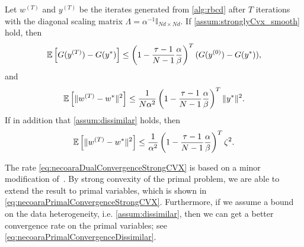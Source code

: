 \begin{theorem} \label{thm:necoaraConvergenceRate}
    Let $w^{(T)}$ and $y^{(T)}$ be the iterates generated from \autoref{alg:rbcd} after $T$ iterations with the diagonal scaling matrix $\Lambda = \alpha^{-1} \mathbb{I}_{Nd \times Nd}$. If \autoref{assum:stronglyCvx_smooth} hold, then
    \begin{equation}
        \mathbb{E} \left[ G( y^{(T)} ) - G( y^* ) \right] \leq \left( 1 - \frac{\tau - 1}{N-1} \frac{\alpha}{\beta} \right)^{T} ( G(y^{(0)}) - G(y^*) ), \label{eq:necoaraDualConvergenceStrongCVX}
    \end{equation}
    and
    \begin{equation}
        \mathbb{E} \left[ \| w^{(T)} - w^* \|^2 \right] 
        \leq \frac{1}{N \alpha^2} \left( 1 - \frac{\tau - 1}{N-1} \frac{\alpha}{\beta} \right)^{T} \|y^*\|^2  \label{eq:necoaraPrimalConvergenceStrongCVX}.
    \end{equation}
    If in addition that \autoref{assum:dissimilar} holds, then
    \begin{equation}
        \mathbb{E} \left[ \| w^{(T)} - w^* \|^2 \right] 
        \leq \frac{1}{\alpha^2} \left( 1 - \frac{\tau - 1}{N-1} \frac{\alpha}{\beta} \right)^{T} \zeta^2. \label{eq:necoaraPrimalConvergenceDissimilar}
    \end{equation}
\end{theorem}

The rate \eqref{eq:necoaraDualConvergenceStrongCVX} is based on a minor modification of~\citet[Theorem~3.1]{necoara2017random}. By strong convexity of the primal problem, we are able to extend the result to primal variables, which is shown in \autoref{eq:necoaraPrimalConvergenceStrongCVX}. Furthermore, if we assume a bound on the data heterogeneity, i.e. \autoref{assum:dissimilar}, then we can get a better convergence rate on the primal variables; see \autoref{eq:necoaraPrimalConvergenceDissimilar}.

